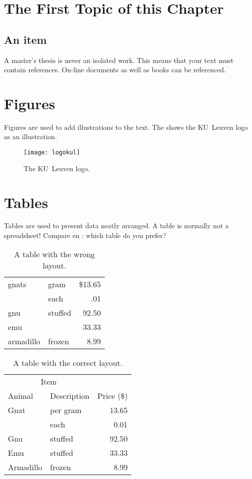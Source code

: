 \section{The First Topic of this Chapter}


\subsection{An item}
A master's thesis is never an isolated work. This means that your text must
contain references. On-line documents\cite{wiki} as well as
books\cite{pratchett06:_good_omens} can be referenced.

\section{Figures}
Figures are used to add illustrations to the text. The  shows
the KU~Leuven logo as an illustration.
\begin{figure}
  \centering
  \texttt{[image: logokul]}
  \caption{The KU~Leuven logo.}
  \label{fig:logo}
\end{figure}

\section{Tables}
Tables are used to present data neatly arranged. A table is normally
not a spreadsheet! Compare  en : which table do
you prefer?

\begin{table}
  \centering
  \begin{tabular}{||l|lr||} \hline
    gnats     & gram      & \$13.65 \\ \cline{2-3}
              & each      & .01 \\ \hline
    gnu       & stuffed   & 92.50 \\ \cline{1-1} \cline{3-3}
    emu       &           & 33.33 \\ \hline
    armadillo & frozen    & 8.99 \\ \hline
  \end{tabular}
  \caption{A table with the wrong layout.}
  \label{tab:wrong}
\end{table}

\begin{table}
  \centering
  \begin{tabular}{@{}llr@{}} \toprule
    \multicolumn{2}{c}{Item} \\ \cmidrule(r){1-2}
    Animal    & Description & Price (\$)\\ \midrule
    Gnat      & per gram    & 13.65 \\
              & each        & 0.01 \\
    Gnu       & stuffed     & 92.50 \\
    Emu       & stuffed     & 33.33 \\
    Armadillo & frozen      & 8.99 \\ \bottomrule
  \end{tabular}
  \caption{A table with the correct layout.}
  \label{tab:ok}
\end{table}



